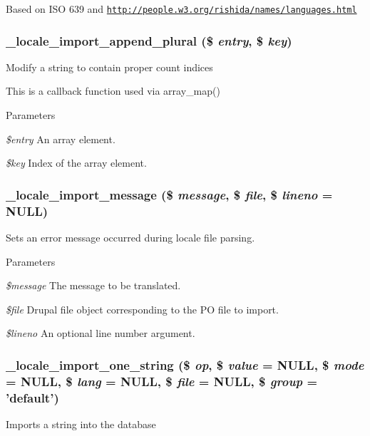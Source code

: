 Based on ISO 639 and \href{http://people.w3.org/rishida/names/languages.html}{\tt http://people.w3.org/rishida/names/languages.html} \hypertarget{group__locale_gad0abff75e696db162d5b90acda071371}{
\subsubsection[{\_\-locale\_\-import\_\-append\_\-plural}]{\setlength{\rightskip}{0pt plus 5cm}\_\-locale\_\-import\_\-append\_\-plural (\$ {\em entry}, \/  \$ {\em key})}}
\label{group__locale_gad0abff75e696db162d5b90acda071371}
Modify a string to contain proper count indices

This is a callback function used via array\_\-map()


\begin{DoxyParams}{Parameters}
\item[{\em \$entry}]An array element. \item[{\em \$key}]Index of the array element. \end{DoxyParams}
\hypertarget{group__locale_gaa6bdc2dc6954e30cabefa65ca596e9d0}{
\subsubsection[{\_\-locale\_\-import\_\-message}]{\setlength{\rightskip}{0pt plus 5cm}\_\-locale\_\-import\_\-message (\$ {\em message}, \/  \$ {\em file}, \/  \$ {\em lineno} = {\ttfamily NULL})}}
\label{group__locale_gaa6bdc2dc6954e30cabefa65ca596e9d0}
Sets an error message occurred during locale file parsing.


\begin{DoxyParams}{Parameters}
\item[{\em \$message}]The message to be translated. \item[{\em \$file}]Drupal file object corresponding to the PO file to import. \item[{\em \$lineno}]An optional line number argument. \end{DoxyParams}
\hypertarget{group__locale_gac065dc774e2258493b661c45c455c709}{
\subsubsection[{\_\-locale\_\-import\_\-one\_\-string}]{\setlength{\rightskip}{0pt plus 5cm}\_\-locale\_\-import\_\-one\_\-string (\$ {\em op}, \/  \$ {\em value} = {\ttfamily NULL}, \/  \$ {\em mode} = {\ttfamily NULL}, \/  \$ {\em lang} = {\ttfamily NULL}, \/  \$ {\em file} = {\ttfamily NULL}, \/  \$ {\em group} = {\ttfamily 'default'})}}
\label{group__locale_gac065dc774e2258493b661c45c455c709}
Imports a string into the database


